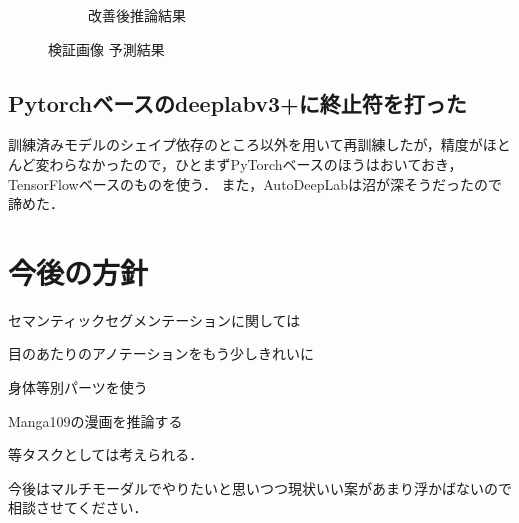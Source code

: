\documentclass[onecolumn]{ujarticle}   %
\begin{document}
\begin{figure}[hb]
\begin{subfigure}{0.49\columnwidth}
			\caption{改善後推論結果}
		\end{subfigure}
		\caption{検証画像 予測結果}
		\label{fig:result}
	\end{figure}


	\subsection{Pytorchベースのdeeplabv3+に終止符を打った}
	訓練済みモデルのシェイプ依存のところ以外を用いて再訓練したが，精度がほとんど変わらなかったので，ひとまずPyTorchベースのほうはおいておき，TensorFlowベースのものを使う．
	また，AutoDeepLabは沼が深そうだったので諦めた．

	\section{今後の方針}\noindent
	セマンティックセグメンテーションに関しては
	\begin{itemize}{
		\item{目のあたりのアノテーションをもう少しきれいに}
		\item{身体等別パーツを使う}
		\item{Manga109の漫画を推論する}
	}
	\end{itemize}
	等タスクとしては考えられる．

	今後はマルチモーダルでやりたいと思いつつ現状いい案があまり浮かばないので相談させてください．
\end{document}

